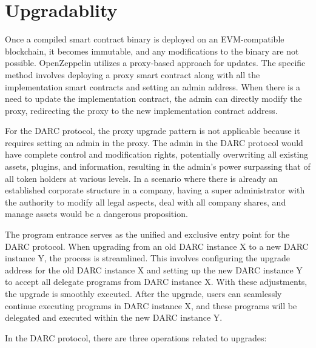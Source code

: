 \documentclass[main.tex]{subfiles}
\begin{document}
\section{Upgradablity}

Once a compiled smart contract binary is deployed on an EVM-compatible blockchain, it becomes immutable, and any modifications to the binary are not possible. OpenZeppelin \cite{proxy} utilizes a proxy-based approach for updates. The specific method involves deploying a proxy smart contract along with all the implementation smart contracts and setting an admin address. When there is a need to update the implementation contract, the admin can directly modify the proxy, redirecting the proxy to the new implementation contract address.

For the DARC protocol, the proxy upgrade pattern is not applicable because it requires setting an admin in the proxy. The admin in the DARC protocol would have complete control and modification rights, potentially overwriting all existing assets, plugins, and information, resulting in the admin's power surpassing that of all token holders at various levels. In a scenario where there is already an established corporate structure in a company, having a super administrator with the authority to modify all legal aspects, deal with all company shares, and manage assets would be a dangerous proposition.

The program entrance serves as the unified and exclusive entry point for the DARC protocol. When upgrading from an old DARC instance X to a new DARC instance Y, the process is streamlined. This involves configuring the upgrade address for the old DARC instance X and setting up the new DARC instance Y to accept all delegate programs from DARC instance X. With these adjustments, the upgrade is smoothly executed. After the upgrade, users can seamlessly continue executing programs in DARC instance X, and these programs will be delegated and executed within the new DARC instance Y.

In the DARC protocol, there are three operations related to upgrades:
\end{document}
